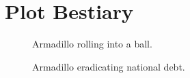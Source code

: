 \chapter{Plot Bestiary}

\vspace*{-3in}

\begin{figure}
\vspace{2.4in}
\caption{Armadillo rolling into a ball.}
\label{arm:fig1}
\end{figure}
\clearpage
\newpage

\begin{figure}
\vspace{2.4in}
\caption{Armadillo eradicating national debt.}
\label{arm:fig2}
\end{figure}
\clearpage
\newpage
